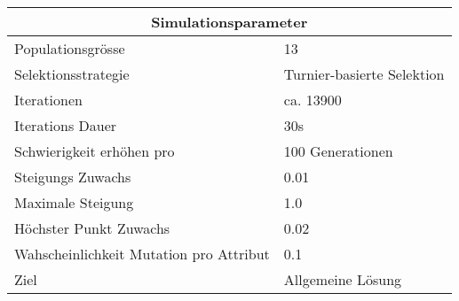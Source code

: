 
    \begin{tabular}{ | l | l | }
      \hline
      \multicolumn{2}{|c|}{Simulationsparameter} \\
      \hline
      Populationsgrösse & 13 \\ \hline
      Selektionsstrategie & Turnier-basierte Selektion \\ \hline
      Iterationen & ca. 13900 \\ \hline
      Iterations Dauer & 30s \\ \hline
      Schwierigkeit erhöhen pro & 100 Generationen \\ \hline
      Steigungs Zuwachs & 0.01 \\ \hline
      Maximale Steigung & 1.0 \\ \hline
      Höchster Punkt Zuwachs & 0.02 \\ \hline
      Wahscheinlichkeit Mutation pro Attribut & 0.1 \\ \hline
      Ziel & Allgemeine Lösung \\ \hline
    \end{tabular}
